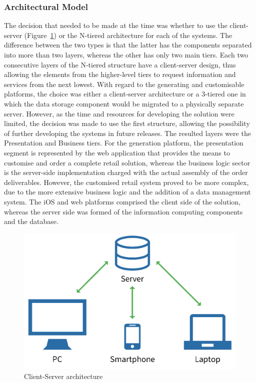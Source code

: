 \subsubsection{Architectural Model}

The decision that needed to be made at the time was whether to use the client-server (Figure~\ref{fig:client_server_model}) or the N-tiered architecture for each of the systems. The difference between the two types is that the latter has the components separated into more than two layers, whereas the other has only two main tiers. Each two consecutive layers of the N-tiered structure have a client-server design, thus allowing the elements from the higher-level tiers to request information and services from the next lowest. With regard to the generating and customisable platforms, the choice was either a client-server architecture or a 3-tiered one in which the data storage component would be migrated to a physically separate server. However, as the time and resources for developing the solution were limited, the decision was made to use the first structure, allowing the possibility of further developing the systems in future releases. The resulted layers were the Presentation and Business tiers. For the generation platform, the presentation segment is represented by the web application that provides the means to customise and order a complete retail solution, whereas the business logic sector is the server-side implementation charged with the actual assembly of the order deliverables. However, the customised retail system proved to be more complex, due to the more extensive business logic and the addition of a data management system. The iOS and web platforms comprised the client side of the solution, whereas the server side was formed of the information computing components and the database.\\

\begin{figure}[!ht]
\centering
\includegraphics[scale=0.1]{img/Client_Server.png}
\caption{Client-Server architecture\cite{terms_2017}}
\label{fig:client_server_model}
\end{figure}


